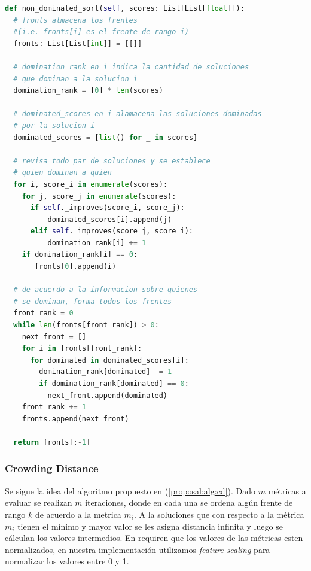 \begin{lstlisting}[caption=Non Dominated Sorting, language=Python]
def non_dominated_sort(self, scores: List[List[float]]):
  # fronts almacena los frentes 
  #(i.e. fronts[i] es el frente de rango i)
  fronts: List[List[int]] = [[]]

  # domination_rank en i indica la cantidad de soluciones
  # que dominan a la solucion i
  domination_rank = [0] * len(scores)

  # dominated_scores en i alamacena las soluciones dominadas
  # por la solucion i
  dominated_scores = [list() for _ in scores]

  # revisa todo par de soluciones y se establece
  # quien dominan a quien
  for i, score_i in enumerate(scores):
    for j, score_j in enumerate(scores):
      if self._improves(score_i, score_j):
          dominated_scores[i].append(j)
      elif self._improves(score_j, score_i):
          domination_rank[i] += 1
    if domination_rank[i] == 0:
       fronts[0].append(i)

  # de acuerdo a la informacion sobre quienes
  # se dominan, forma todos los frentes
  front_rank = 0
  while len(fronts[front_rank]) > 0:
    next_front = []
    for i in fronts[front_rank]:
      for dominated in dominated_scores[i]:
        domination_rank[dominated] -= 1
        if domination_rank[dominated] == 0:
          next_front.append(dominated)
    front_rank += 1
    fronts.append(next_front)

  return fronts[:-1]
\end{lstlisting}

\subsubsection{Crowding Distance}
Se sigue la idea del algoritmo propuesto en (\ref{proposal:alg:cd}). Dado $m$ m\'etricas a evaluar se realizan $m$ iteraciones, donde en cada una se ordena alg\'un frente de rango $k$ de acuerdo a la metrica $m_i$. A la soluciones que con respecto a la m\'etrica $m_i$ tienen el m\'inimo y mayor valor se les asigna distancia infinita y luego se c\'alculan los valores intermedios. En \cite{deb2002fast} requiren que los valores de las m\'etricas esten normalizados, en nuestra implementaci\'on utilizamos \textit{feature scaling} para normalizar los valores entre 0 y 1.

